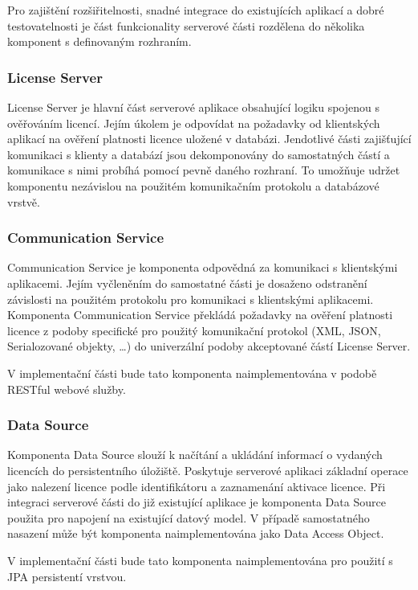 Pro zajištění rozšiřitelnosti, snadné integrace do existujících aplikací a dobré
testovatelnosti je část funkcionality serverové části rozdělena do několika
komponent s definovaným rozhraním.

\subsubsection*{License Server}

License Server je hlavní část serverové aplikace obsahující logiku spojenou s
ověřováním licencí. Jejím úkolem je odpovídat na požadavky od klientských aplikací na
ověření platnosti licence uložené v databázi. Jendotlivé části zajišťující
komunikaci s klienty a databází jsou dekomponovány do samostatných částí a
komunikace s nimi probíhá pomocí pevně daného rozhraní. To umožňuje udržet
komponentu nezávislou na použitém komunikačním protokolu a databázové vrstvě.

\subsubsection*{Communication Service}

Communication Service je komponenta odpovědná za komunikaci s klientskými
aplikacemi. Jejím vyčleněním do samostatné části je dosaženo odstranění
závislosti na použitém protokolu pro komunikaci s klientskými aplikacemi.
Komponenta Communication Service překládá požadavky na ověření platnosti licence
z podoby specifické pro použitý komunikační protokol (XML, JSON, Serialozované
objekty, \ldots) do univerzální podoby akceptované částí License Server.

V implementační části bude tato komponenta naimplementována v podobě
RESTful\cite{rest} webové služby.

\subsubsection*{Data Source}

Komponenta Data Source slouží k načítání a ukládání informací o vydaných
licencích do persistentního úložiště. Poskytuje serverové aplikaci základní operace jako
nalezení licence podle identifikátoru a zaznamenání aktivace licence. Při
integraci serverové části do již existující aplikace je komponenta Data Source
použita pro napojení na existující datový model. V případě samostatného nasazení
může být komponenta naimplementována jako Data Access Object.

V implementační části bude tato komponenta naimplementována pro
použití s JPA\cite{rest} persistentí vrstvou.
